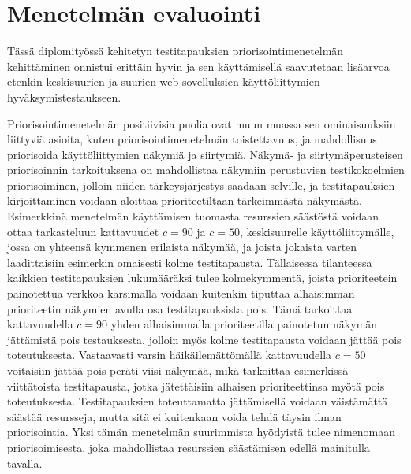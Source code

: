 \section{Menetelmän evaluointi} \label{ch:12_menetelman_evaluointi}

  Tässä diplomityössä kehitetyn testitapauksien priorisointimenetelmän kehittäminen onnistui erittäin hyvin ja sen käyttämisellä saavutetaan lisäarvoa etenkin keskisuurien ja suurien web-sovelluksien käyttöliittymien hyväksymistestaukseen.

  Priorisointimenetelmän positiivisia puolia ovat muun muassa sen ominaisuuksiin liittyviä asioita, kuten priorisointimenetelmän toistettavuus, ja mahdollisuus priorisoida käyttöliittymien näkymiä ja siirtymiä.
  Näkymä- ja siirtymäperusteisen priorisoinnin tarkoituksena on mahdollistaa näkymiin perustuvien testikokoelmien priorisoiminen, jolloin niiden tärkeysjärjestys saadaan selville, ja testitapauksien kirjoittaminen voidaan aloittaa prioriteetiltaan tärkeimmästä näkymästä.
  Esimerkkinä menetelmän käyttämisen tuomasta resurssien säästöstä voidaan ottaa tarkasteluun kattavuudet \(c=90\) ja \(c=50\), keskisuurelle käyttöliittymälle, jossa on yhteensä kymmenen erilaista näkymää, ja joista jokaista varten laadittaisiin esimerkin omaisesti kolme testitapausta.
  Tällaisessa tilanteessa kaikkien testitapauksien lukumääräksi tulee kolmekymmentä, joista prioriteetein painotettua verkkoa karsimalla voidaan kuitenkin tiputtaa alhaisimman prioriteetin näkymien avulla osa testitapauksista pois.
  Tämä tarkoittaa kattavuudella \(c=90\) yhden alhaisimmalla prioriteetilla painotetun näkymän jättämistä pois testauksesta, jolloin myös kolme testitapausta voidaan jättää pois toteutuksesta.
  Vastaavasti varsin häikäilemättömällä kattavuudella \(c=50\) voitaisiin jättää pois peräti viisi näkymää, mikä tarkoittaa esimerkissä viittätoista testitapausta, jotka jätettäisiin alhaisen prioriteettinsa myötä pois toteutuksesta.
  Testitapauksien toteuttamatta jättämisellä voidaan väistämättä säästää resursseja, mutta sitä ei kuitenkaan voida tehdä täysin ilman priorisointia.
  Yksi tämän menetelmän suurimmista hyödyistä tulee nimenomaan priorisoimisesta, joka mahdollistaa resurssien säästämisen edellä mainitulla tavalla.

